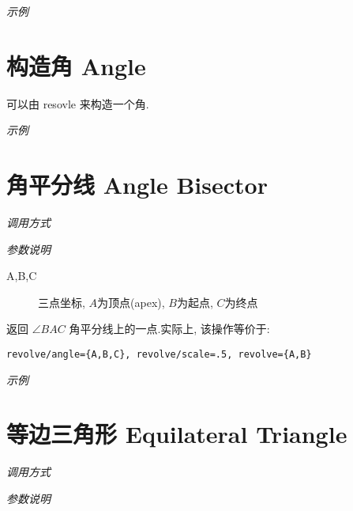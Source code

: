 \emph{示例}




\section{构造角 Angle}

可以由 resovle 来构造一个角.

\emph{示例}


\section{角平分线 Angle Bisector}

\emph{调用方式}

\begin{tcolorbox}{}
\end{tcolorbox}

\emph{参数说明}

\begin{description}
  \item[A,B,C] 三点坐标, $A$为顶点(apex), $B$为起点, $C$为终点
\end{description}

返回 $\angle{BAC}$ 角平分线上的一点.实际上, 该操作等价于:

\begin{verbatim}
revolve/angle={A,B,C}, revolve/scale=.5, revolve={A,B}
\end{verbatim}

\emph{示例}


\section{等边三角形 Equilateral Triangle}

\emph{调用方式}

\begin{tcolorbox}{}
\end{tcolorbox}

\emph{参数说明}

